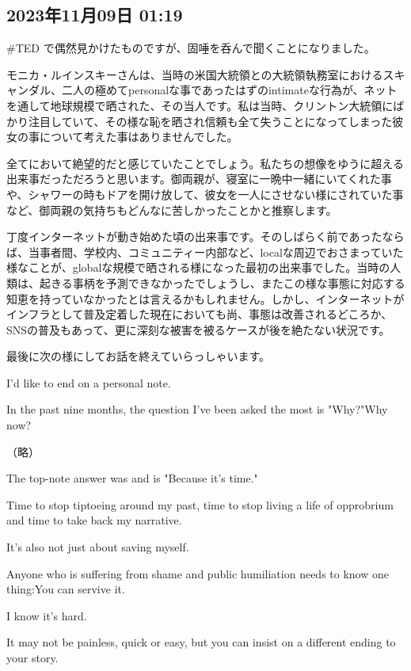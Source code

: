 \documentclass[facebook_diary.tex]{subfiles}
\begin{document}
\subsection*{2023年11月09日 01:19}

\#TED で偶然見かけたものですが、固唾を呑んで聞くことになりました。


モニカ・ルインスキーさんは、当時の米国大統領との大統領執務室におけるスキャンダル、二人の極めてpersonalな事であったはずのintimateな行為が、ネットを通して地球規模で晒された、その当人です。私は当時、クリントン大統領にばかり注目していて、その様な恥を晒され信頼も全て失うことになってしまった彼女の事について考えた事はありませんでした。

全てにおいて絶望的だと感じていたことでしょう。私たちの想像をゆうに超える出来事だっただろうと思います。御両親が、寝室に一晩中一緒にいてくれた事や、シャワーの時もドアを開け放して、彼女を一人にさせない様にされていた事など、御両親の気持ちもどんなに苦しかったことかと推察します。

丁度インターネットが動き始めた頃の出来事です。そのしばらく前であったならば、当事者間、学校内、コミュニティー内部など、localな周辺でおさまっていた様なことが、globalな規模で晒される様になった最初の出来事でした。当時の人類は、起きる事柄を予測できなかったでしょうし、またこの様な事態に対応する知恵を持っていなかったとは言えるかもしれません。しかし、インターネットがインフラとして普及定着した現在においても尚、事態は改善されるどころか、SNSの普及もあって、更に深刻な被害を被るケースが後を絶たない状況です。

最後に次の様にしてお話を終えていらっしゃいます。


I'd like to end on a personal note.

In the past nine months, the question I've been asked the most is "Why?"Why now?

（略）

The top-note answer was and is "Because it's time."

Time to stop tiptoeing around my past, time to stop living a life of opprobrium and time to take back my narrative.

It's also not just about saving myself.

Anyone who is suffering from shame and public humiliation needs to know one thing:You can servive it.

I know it's hard.

It may not be painless, quick or easy, but you can insist on a different ending to your story.
\end{document}
